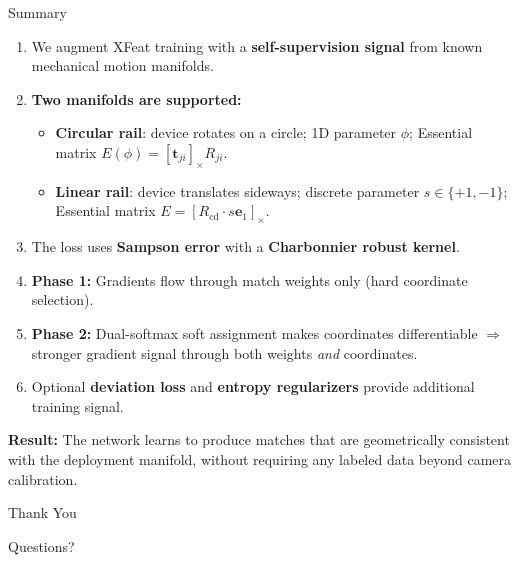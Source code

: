 \documentclass[aspectratio=169, 12pt]{beamer}
\newcommand{\Rcd}{R_{\mathrm{cd}}}
\begin{document}
\begin{frame}{Summary}
\small
\begin{enumerate}\setlength{\itemsep}{2pt}
    \item We augment XFeat training with a \textbf{self-supervision signal} from known
          mechanical motion manifolds.
    \item \textbf{Two manifolds are supported:}
    \begin{itemize}\setlength{\itemsep}{1pt}
        \item \textbf{Circular rail}: device rotates on a circle; 1D parameter $\phi$;
              Essential matrix $E(\phi) = [\mathbf{t}_{ji}]_\times R_{ji}$.
        \item \textbf{Linear rail}: device translates sideways; discrete parameter $s \in \{+1,-1\}$;
              Essential matrix $E = [\Rcd \cdot s\mathbf{e}_1]_\times$.
    \end{itemize}
    \item The loss uses \textbf{Sampson error} with a \textbf{Charbonnier robust kernel}.
    \item \textbf{Phase 1:} Gradients flow through match weights only
          (hard coordinate selection).
    \item \textbf{Phase 2:} Dual-softmax soft assignment makes coordinates differentiable
          $\Rightarrow$ stronger gradient signal through both weights \emph{and} coordinates.
    \item Optional \textbf{deviation loss} and \textbf{entropy regularizers} provide
          additional training signal.
\end{enumerate}

\vspace{0.3em}
\textbf{Result:} The network learns to produce matches that are geometrically consistent
with the deployment manifold, without requiring any labeled data beyond camera calibration.
\end{frame}

\begin{frame}{}
\begin{center}
    {\Huge Thank You}

    \vspace{1em}
    {\large Questions?}
\end{center}
\end{frame}
\end{document}
